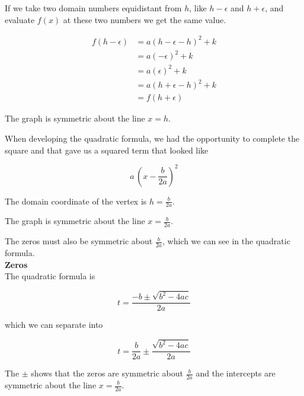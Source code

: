 \documentclass{ximera}
\begin{document}
If we take two domain numbers equidistant from $h$, like $h - \epsilon$ and $h + \epsilon$, and evaluate $f(x)$ at these two numbers we get the same value.


\begin{align*}
f(h - \epsilon) & = a (h - \epsilon - h)^2 + k \\
& = a (-\epsilon)^2 + k  \\
& = a (\epsilon)^2 + k  \\
& = a (h + \epsilon - h)^2 + k \\
& = f(h + \epsilon)
\end{align*}


The graph is symmetric about the line $x = h$.


When developing the quadratic formula, we had the opportunity to complete the square and that gave us a squared term that looked like 

\[  a \, \left(x - \frac{b}{2a}\right)^2       \]


The domain coordinate of the vertex is $h = \frac{b}{2a}$.


The graph is symmetric about the line $x = \frac{b}{2a}$.






The zeros must also be symmetric about $\frac{b}{2a}$, which we can see in the quadratic formula. \\





 \textbf{\textcolor{blue!75!black}{Zeros}}  \\

The quadratic formula is

\[ t  =   \frac{-b \pm \sqrt{b^2 - 4 a c}}{2a}      \]



which we can separate into 



\[ t  =   \frac{b}{2a} \pm \frac{\sqrt{b^2 - 4 a c}}{2a}      \]


The $\pm$ shows that the zeros are symmetric about $\frac{b}{2a}$ and the intercepts are symmetric about the line $x = \frac{b}{2a}$.
\end{document}
